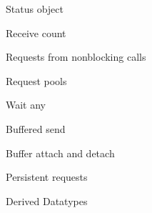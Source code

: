 \documentclass[10pt]{beamer}
\begin{document}
\begin{numberedframe}{Status object}
  
  
\end{numberedframe}
\begin{numberedframe}{Receive count}
  
\end{numberedframe}

\begin{numberedframe}{Requests from nonblocking calls}
  
\end{numberedframe}
\begin{numberedframe}{Request pools}
  
\end{numberedframe}
\begin{numberedframe}{Wait any}
  
\end{numberedframe}
\begin{exerciseframe}[setdiff]
  
\end{exerciseframe}

\begin{numberedframe}{Buffered send}
  
\end{numberedframe}
\begin{numberedframe}{Buffer attach and detach}
  
\end{numberedframe}
\begin{numberedframe}{Persistent requests}
  
\end{numberedframe}

 {Derived Datatypes}
\end{document}
